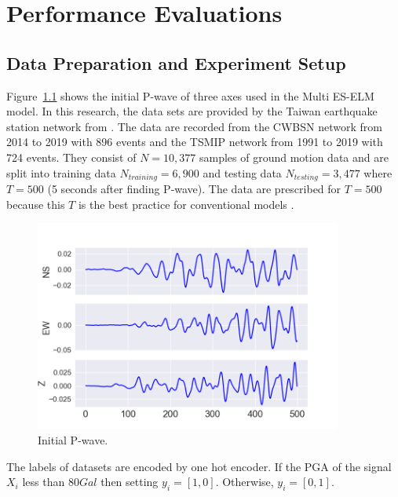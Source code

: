 \chapter{Performance Evaluations}\label{chap:performance}

\section{Data Preparation and Experiment Setup}
Figure~\ref{fig:input-data} shows the initial P-wave of three axes used in the Multi ES-ELM model. In this research, the data sets are provided by the Taiwan earthquake station network from \cite{chiang2022neural}.
The data are recorded from the CWBSN network from 2014 to 2019 with 896 events and the TSMIP network from 1991 to 2019 with 724 events. They consist of $N = 10,377$ samples of ground motion data and are split into training data $N_{training} = 6,900$ and testing data $N_{testing} = 3,477$ where $T = 500$ (5 seconds after finding P-wave). The data are prescribed for $T = 500$ because this $T$ is the best practice for conventional models \cite{chiang2022neural}.

\begin{figure}[ht]
\centering
\includegraphics[width=0.9\textwidth]{img/3-axis.png}
\caption{Initial P-wave.} \label{fig:input-data}
\end{figure} 

The labels of datasets are encoded by one hot encoder. If the PGA of the signal $X_i$ less than $80Gal$ then setting $y_i = [1, 0]$. Otherwise, $y_i = [0, 1]$.

